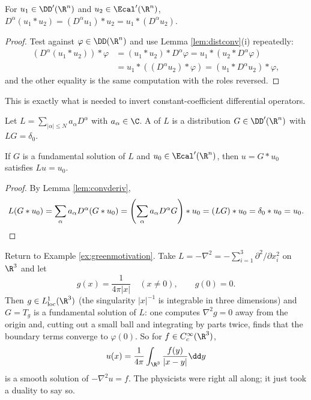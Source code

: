 \begin{lemma}\label{lem:convderiv}
	For $u_1\in\DD'(\R^n)$ and $u_2\in\Ecal'(\R^n)$, $D^\alpha(u_1*u_2)=(D^\alpha u_1)*u_2 = u_1*(D^\alpha u_2)$.
\end{lemma}

\begin{proof}
	Test against $\varphi \in \DD(\R^n)$ and use Lemma \ref{lem:distconv}(i) repeatedly:
	\begin{align*}
		(D^\alpha(u_1*u_2))*\varphi &= (u_1*u_2)*D^\alpha\varphi = u_1*(u_2*D^\alpha\varphi) \\
		&= u_1*((D^\alpha u_2)*\varphi)=(u_1*D^\alpha u_2)*\varphi,
	\end{align*}
	and the other equality is the same computation with the roles reversed.
\end{proof}

This is exactly what is needed to invert constant-coefficient differential operators.

\begin{definition}
	Let $L=\sum_{|\alpha|\le N}a_\alpha D^\alpha$ with $a_\alpha \in\C$. A  of $L$ is a distribution $G \in \DD'(\R^n)$ with $LG=\delta_0$.
\end{definition}

\begin{theorem}\label{thm:fundsol}
	If $G$ is a fundamental solution of $L$ and $u_0 \in \Ecal'(\R^n)$, then $u = G * u_0$ satisfies $Lu = u_0$.
\end{theorem}

\begin{proof}
	By Lemma \ref{lem:convderiv},
	$$L(G*u_0)=\sum_\alpha a_\alpha D^\alpha(G*u_0)=\left(\sum_\alpha a_\alpha D^\alpha G\right)*u_0=(LG)*u_0=\delta_0*u_0=u_0. \qedhere$$
\end{proof}

\begin{example}
	Return to Example \ref{ex:greenmotivation}. Take $L=-\nabla^2=-\sum_{i=1}^3\partial^2/\partial x_i^2$ on $\R^3$ and let
	$$g(x)=\frac{1}{4\pi|x|} \quad (x\ne0), \qquad g(0)=0.$$
	Then $g \in L^1_{\mathrm{loc}}(\R^3)$ (the singularity $|x|^{-1}$ is integrable in three dimensions) and $G = T_g$ is a fundamental solution of $L$: one computes $\nabla^2 g = 0$ away from the origin and, cutting out a small ball and integrating by parts twice, finds that the boundary terms converge to $\varphi(0)$. So for $f \in C_c^\infty(\R^3)$,
	$$u(x)=\frac{1}{4\pi}\int_{\R^3}\frac{f(y)}{|x-y|}\dd y$$
	is a smooth solution of $-\nabla^2u=f$. The physicists were right all along; it just took a duality to say so.
\end{example}

